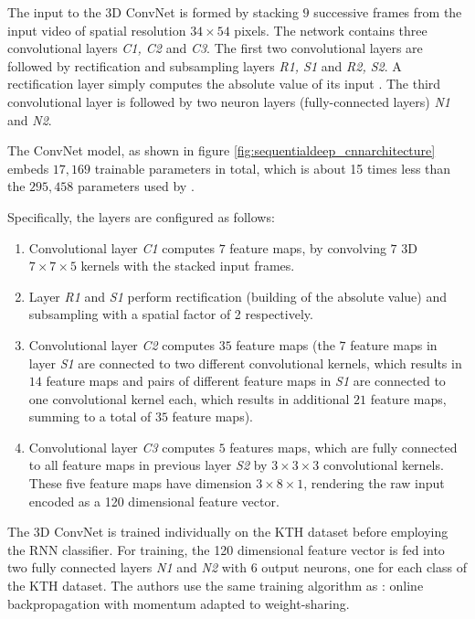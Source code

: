 The input to the 3D ConvNet is formed by stacking $9$ successive frames from the input video of spatial resolution $34\times54$ pixels.
The network contains three convolutional layers \textit{C1, C2} and \textit{C3}.
The first two convolutional layers are followed by rectification and subsampling layers \textit{R1, S1} and \textit{R2, S2}.
A rectification layer simply computes the absolute value of its input \cite{baccouche_sequential_2011}.
The third convolutional layer is followed by two neuron layers (fully-connected layers) \textit{N1} and \textit{N2}.

The ConvNet model, as shown in figure \ref{fig:sequentialdeep_cnnarchitecture} embeds $17,169$ trainable parameters in total, which is about 15 times less than the $295,458$ parameters used by \textcite{ji_3d_2013}.

Specifically, the layers are configured as follows:
\begin{enumerate}
    \item Convolutional layer \textit{C1} computes $7$ feature maps, by convolving $7$ 3D $7\times7\times5$ kernels with the stacked input frames.
    \item Layer \textit{R1} and \textit{S1} perform rectification (building of the absolute value) and subsampling with a spatial factor of 2 respectively.
    \item Convolutional layer \textit{C2} computes $35$ feature maps (the $7$ feature maps in layer \textit{S1} are connected to two different convolutional kernels, which results in $14$ feature maps and pairs of different feature maps in \textit{S1} are connected to one convolutional kernel each, which results in additional $21$ feature maps, summing to a total of $35$ feature maps).
    \item Convolutional layer \textit{C3} computes $5$ features maps, which are fully connected to all feature maps in previous layer \textit{S2} by $3\times3\times3$ convolutional kernels. These five feature maps have dimension $3\times8\times1$, rendering the raw input encoded as a 120 dimensional feature vector.
\end{enumerate}

The 3D ConvNet is trained individually on the KTH dataset before employing the RNN classifier.
For training, the 120 dimensional feature vector is fed into two fully connected layers \textit{N1} and \textit{N2} with 6 output neurons, one for each class of the KTH dataset.
The authors use the same training algorithm as \textcite{ji_3d_2013}: online backpropagation with momentum adapted to weight-sharing.

